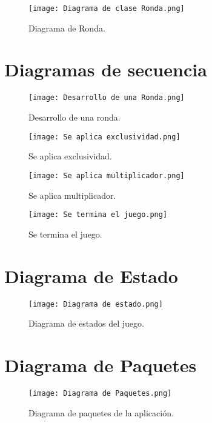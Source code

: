 \documentclass[titlepage,a4paper]{article}
\begin{document}
\begin{figure}[H]
\centering
\texttt{[image: Diagrama de clase Ronda.png]}
\caption{\label{fig:seq01}Diagrama de Ronda.}
\end{figure}


\section{Diagramas de secuencia}\label{sec:diagramasdesecuencia}

\begin{figure}[H]
\centering
\texttt{[image: Desarrollo de una Ronda.png]}
\caption{\label{fig:seq01}Desarrollo de una ronda.}
\end{figure}

\begin{figure}[H]
\centering
\texttt{[image: Se aplica exclusividad.png]}
\caption{\label{fig:seq01}Se aplica exclusividad.}
\end{figure}

\begin{figure}[H]
\centering
\texttt{[image: Se aplica multiplicador.png]}
\caption{\label{fig:seq01}Se aplica multiplicador.}
\end{figure}

\begin{figure}[H]
\centering
\texttt{[image: Se termina el juego.png]}
\caption{\label{fig:seq01}Se termina el juego.}
\end{figure}


\section{Diagrama de Estado}\label{sec:diagramasdeestado}

\begin{figure}[H]
\centering
\texttt{[image: Diagrama de estado.png]}
\caption{\label{fig:seq01}Diagrama de estados del juego.}
\end{figure}

\section{Diagrama de Paquetes}\label{sec:diagramasdepaquete}

\begin{figure}[H]
\centering
\texttt{[image: Diagrama de Paquetes.png]}
\caption{\label{fig:seq01}Diagrama de paquetes de la aplicación.}
\end{figure}
\end{document}
